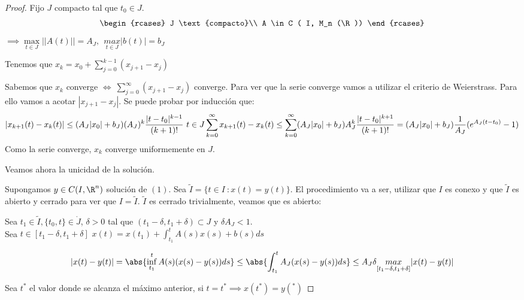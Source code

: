 \begin{proof}

  Fijo $J$ compacto tal que $t_0 \in J$.\\
\[
  \begin{rcases}
    J \text{compacto}\\
    A \in C ( I, M_n (\R))
  \end{rcases}
\]
  $\implies \underset{t \in J}{\max} || A(t) || = A_J , \ \ \underset{t \in J}{max} |b(t)| = b_J $

  Tenemos que $x_k = x_0 + \sum_{j=0}^{k-1} (x_{j+1} - x_j)$

  Sabemos que $x_k$ converge $\iff \ \sum_{j=0}^{\infty} (x_{j+1} - x_j )$ converge. Para ver que la serie converge vamos a utilizar el criterio de Weierstrass. Para ello vamos a acotar $|x_{j+1} - x_j |$. Se puede probar por inducción que:
  \[
  |x_{k+1} (t) - x_k (t) | \leq (A_J |x_0| + b_J) (A_J )^k \frac{|t-t_0| ^{k-1}}{(k+1)!} \ t \in J\\
  \sum_{k=0}^{\infty} x_{k+1} (t) - x_k (t) \leq \sum_{k=0} ^{\infty} (A_J |x_0| + b_J) A_J ^k \frac{|t-t_0|^{k+1}}{(k+1)!} = (A_J |x_0| + b_J) \frac{1}{A_J} (e^{A_J (t-t_0)}-1)
  \]
  Como la serie converge, $x_k$ converge uniformemente en $J$.

  Veamos ahora la unicidad de la solución.

  Supongamos $y \in C(I,\R ^n)$ solución de $(1)$. Sea $\tilde{I} = \{ t \in I \ : x(t) = y(t) \}$. El procedimiento va a ser, utilizar que $I$ es conexo y que $\tilde{I}$ es abierto y cerrado para ver que $I=\tilde{I}$. $\tilde{I}$ es cerrado trivialmente, veamos que es abierto:

  Sea $t_1 \in \tilde{I}, \{t_0 , t\} \in \mathring{J}$, $\delta > 0$ tal que $(t_1 - \delta , t_1 + \delta ) \subset J$ y $\delta A_J < 1$.\\
  Sea $t \in [t_1 - \delta, t_1 + \delta]$ $x(t) = x(t_1 ) + \int_{t_1} ^{t} A(s)x(s)+b(s) ds$

  \[
  |x(t) - y(t)| = \abs{\inf _{t_1} ^t A(s)(x(s) - y(s)) ds} \leq \abs{\int _{t_1} ^t A_J (x(s) - y(s)) ds} \leq A_J \delta \underset{[t_1 - \delta , t_1 + \delta]}{max} |x(t) - y(t)| 
  \]

  Sea $t^*$ el valor donde se alcanza el máximo anterior, si $t=t^* \implies x(t^*) = y(^*)$

  
\end{proof}
